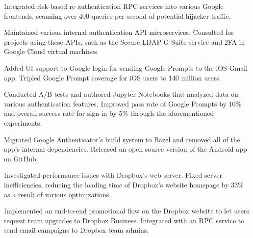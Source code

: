 \documentclass[]{template}
\begin{document}
\sectionsep

\hfill
{}
\begin{tightemize}
\item
  Integrated risk-based re-authentication RPC services into various Google
  frontends, scanning over 400 queries-per-second of potential hijacker traffic.
\item
  Maintained various internal authentication API microservices.
  Consulted for projects using these APIs, such as the Secure LDAP G Suite
  service and 2FA in Google Cloud virtual machines.
\item
  Added UI support to Google login for sending Google Prompts to the iOS Gmail
  app.
  Tripled Google Prompt coverage for iOS users to 140 million users.
\item
  Conducted A/B tests and authored Jupyter Notebooks that analyzed data on
  various authentication features.
  Improved pass rate of Google Prompts by 10\% and overall success rate for
  sign-in by 5\% through the aforementioned experiments.
\item
  Migrated Google Authenticator's build system to Bazel and removed all of the
  app's internal dependencies.
  Released an open source version of the Android app on GitHub.
\item
\end{tightemize}

\sectionsep

\hfill
{}
\begin{tightemize}
\item
  Investigated performance issues with Dropbox's web server.
  Fixed server inefficiencies, reducing the loading time of Dropbox's website
  homepage by 33\% as a result of various optimizations.
\item
  Implemented an end-to-end promotional flow on the Dropbox website to let users
  request team upgrades to Dropbox Business.
  Integrated with an RPC service to send email campaigns to Dropbox team admins.
\item
\end{tightemize}

\sectionsep
\end{document}

